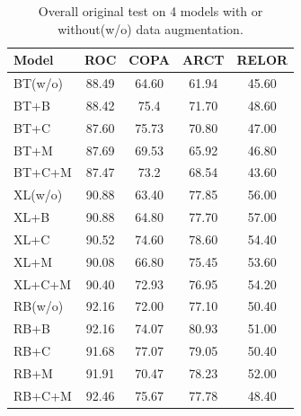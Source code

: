 \begin{table}[th]
    \scriptsize
    \centering
        \begin{tabular}{l|c|c|c|c} \toprule
            \textbf{Model} &\bf{ROC} &\bf{COPA} & \bf{ARCT} & \bf{RELOR} \\ \midrule
BT(w/o)&88.49&64.60&61.94&45.60\\
BT+B&88.42&75.4&71.70&48.60\\
BT+C&87.60&75.73&70.80&47.00\\
BT+M&87.69&69.53&65.92&46.80\\
BT+C+M&87.47&73.2&68.54&43.60\\
            \midrule
XL(w/o)&90.88&63.40&77.85&56.00\\
XL+B&90.88&64.80&77.70&57.00\\
XL+C&90.52&74.60 &78.60&54.40\\
XL+M&90.08&66.80&75.45&53.60\\
XL+C+M&90.40&72.93&76.95&54.20\\
            \midrule
RB(w/o)&92.16&72.00&77.10&50.40\\
RB+B&92.16&74.07&80.93&51.00\\
RB+C&91.68&77.07&79.05&50.40\\
RB+M&91.91&70.47&78.23&52.00\\
RB+C+M&92.46&75.67&77.78& 48.40\\
            \bottomrule
        \end{tabular}
    \caption{\label{tab:oriresults} Overall original test
        on 4 models with or without(w/o) data augmentation. %
}
\end{table}




